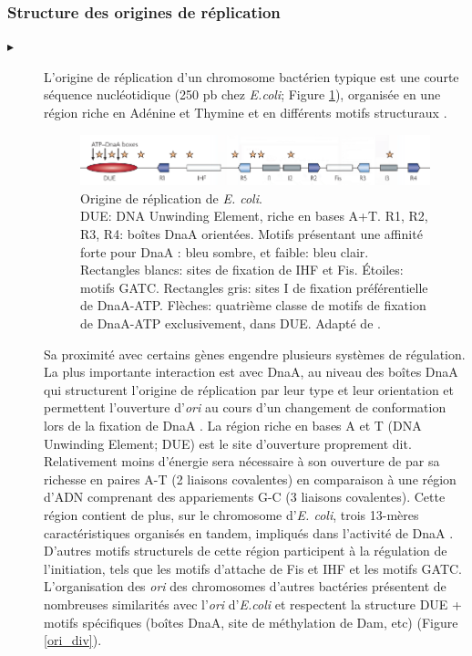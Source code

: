 \subsubsection{Structure des origines de réplication}\label{oristruct}
\begin{description}
\item[$\blacktriangleright$] L'origine de réplication d'un chromosome bactérien typique est une courte séquence nucléotidique (250 pb chez \textit{E.coli}; Figure \ref{figoriecoli}), organisée en une région riche en Adénine et Thymine et en différents motifs structuraux \citep{Robinson2005,rajewska2012rich}.
\begin{figure}[H]
	\begin{center}
		\includegraphics[width=0.9\linewidth]{./img/ori_schema.png}
	\caption[Structure de l'origine de réplication de \textit{E. coli}]{Origine de réplication de \textit{E. coli}.\\ DUE: DNA Unwinding Element, riche en bases A+T. R1, R2, R3, R4: boîtes DnaA orientées. Motifs présentant une affinité forte pour DnaA : bleu sombre, et faible: bleu clair. Rectangles blancs: sites de fixation de IHF et Fis. Étoiles: motifs GATC. Rectangles gris: sites I de fixation préférentielle de DnaA-ATP. Flèches: quatrième classe de motifs de fixation de DnaA-ATP exclusivement, dans DUE. Adapté de \citep{Mott2007}.}\label{figoriecoli}
	\end{center}
\end{figure} 
Sa proximité avec certains gènes engendre plusieurs systèmes de régulation. La plus importante interaction est avec DnaA, au niveau des boîtes DnaA qui structurent l'origine de réplication par leur type et leur orientation et permettent l'ouverture d'\textit{ori} au cours d'un changement de conformation lors de la fixation de DnaA \citep{Mott2007}. La région riche en bases A et T (DNA Unwinding Element; DUE) est le site d'ouverture proprement dit. Relativement moins d'énergie sera nécessaire à son ouverture de par sa richesse en paires A-T (2 liaisons covalentes) en comparaison à une région d'ADN comprenant des appariements G-C (3 liaisons covalentes). Cette région contient de plus, sur le chromosome d'\textit{E. coli}, trois 13-mères caractéristiques organisés en tandem, impliqués dans l'activité de DnaA \citep{Mott2007}. D'autres motifs structurels de cette région participent à la régulation de l'initiation, tels que les motifs d'attache de Fis et IHF et les motifs GATC. L'organisation des \textit{ori} des chromosomes d'autres bactéries présentent de nombreuses similarités avec l'\textit{ori} d'\textit{E.coli} et respectent la structure DUE + motifs spécifiques (boîtes DnaA, site de méthylation de Dam, etc) (Figure \ref{ori_div}). 
\end{description}

